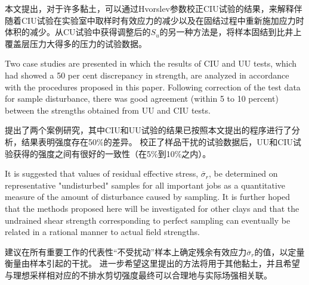 \begin{paracol}{2}
    \switchcolumn

    本文提出，对于许多黏土，可以通过Hvorslev参数校正CIU试验的结果，来解释伴随着CIU试验在实验室中取样时有效应力的减少以及在固结过程中重新施加应力时体积的减少。从CU试验中获得调整后的$S_u$的另一种方法是，将样本固结到比井上覆盖层压力大得多的压力的试验数据。

    \switchcolumn*

    Two case studies are presented in which the results of CIU and UU tests, which had showed a 50 per cent discrepancy in strength, are analyzed in accordance with the procedures proposed in this paper. Following correction of the test data for sample disturbance, there was good agreement (within 5 to 10 percent) between the strengths obtained from UU and CIU tests.

    \switchcolumn

    提出了两个案例研究，其中CIU和UU试验的结果已按照本文提出的程序进行了分析，结果表明强度存在50$\%$的差异。 校正了样品干扰的试验数据后，UU和CIU试验获得的强度之间有很好的一致性（在5$\%$到10$\%$之内）。

    \switchcolumn*

    It is suggested that values of residual effective stress, $\overline{\sigma}_r$, be determined on representative "undisturbed" samples for all important jobs as a quantitative measure of the amount of disturbance caused by sampling. It is further hoped that the methods proposed here will be investigated for other clays and that the undrained shear strength corresponding to perfect sampling can eventually be related in a rational manner to actual field strengths.

    \switchcolumn

    建议在所有重要工作的代表性“不受扰动”样本上确定残余有效应力$\overline{\sigma}_r$的值，以定量衡量由样本引起的干扰。 进一步希望这里提出的方法将用于其他黏土，并且希望与理想采样相对应的不排水剪切强度最终可以合理地与实际场强相关联。

\end{paracol}


